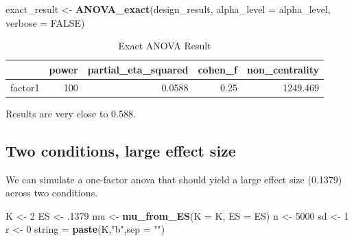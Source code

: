 \documentclass[]{book}
\newenvironment{Shaded}{\begin{snugshade}}{\end{snugshade}}
\newcommand{\DataTypeTok}[1]{\textcolor[rgb]{0.13,0.29,0.53}{#1}}
\newcommand{\DecValTok}[1]{\textcolor[rgb]{0.00,0.00,0.81}{#1}}
\newcommand{\FloatTok}[1]{\textcolor[rgb]{0.00,0.00,0.81}{#1}}
\newcommand{\KeywordTok}[1]{\textcolor[rgb]{0.13,0.29,0.53}{\textbf{#1}}}
\newcommand{\NormalTok}[1]{#1}
\newcommand{\OtherTok}[1]{\textcolor[rgb]{0.56,0.35,0.01}{#1}}
\newcommand{\StringTok}[1]{\textcolor[rgb]{0.31,0.60,0.02}{#1}}
\begin{document}
\begin{Shaded}
\begin{Highlighting}[]
\NormalTok{exact_result <-}\StringTok{ }\KeywordTok{ANOVA_exact}\NormalTok{(design_result,}
                            \DataTypeTok{alpha_level =}\NormalTok{ alpha_level,}
                            \DataTypeTok{verbose =} \OtherTok{FALSE}\NormalTok{)}
\end{Highlighting}
\end{Shaded}

\begin{table}[t]

\caption{\label{tab:unnamed-chunk-66}Exact ANOVA Result}
\centering
\begin{tabular}{l|r|r|r|r}
\hline
  & power & partial\_eta\_squared & cohen\_f & non\_centrality\\
\hline
factor1 & 100 & 0.0588 & 0.25 & 1249.469\\
\hline
\end{tabular}
\end{table}

Results are very close to 0.588.

\hypertarget{two-conditions-large-effect-size}{%
\subsection{Two conditions, large effect size}\label{two-conditions-large-effect-size}}

We can simulate a one-factor anova that should yield a large effect size (0.1379) across two conditions.

\begin{Shaded}
\begin{Highlighting}[]
\NormalTok{K <-}\StringTok{ }\DecValTok{2}
\NormalTok{ES <-}\StringTok{ }\FloatTok{.1379}
\NormalTok{mu <-}\StringTok{ }\KeywordTok{mu_from_ES}\NormalTok{(}\DataTypeTok{K =}\NormalTok{ K, }\DataTypeTok{ES =}\NormalTok{ ES)}
\NormalTok{n <-}\StringTok{ }\DecValTok{5000}
\NormalTok{sd <-}\StringTok{ }\DecValTok{1}
\NormalTok{r <-}\StringTok{ }\DecValTok{0}
\NormalTok{string =}\StringTok{ }\KeywordTok{paste}\NormalTok{(K,}\StringTok{"b"}\NormalTok{,}\DataTypeTok{sep =} \StringTok{""}\NormalTok{)}
\end{Highlighting}
\end{Shaded}
\end{document}
